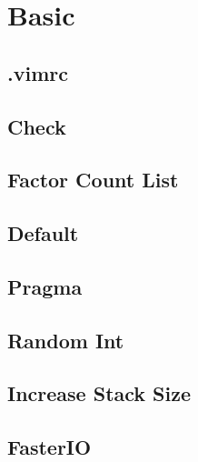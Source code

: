\documentclass[a4paper,10pt,twocolumn,oneside]{article}
\begin{document}
\pagestyle{fancy}
\fancyfoot{}
\fancyhead[R]{\thepage}
\renewcommand{\headrulewidth}{0.4pt}
\renewcommand{\contentsname}{Contents}


\scriptsize
\tableofcontents


\section{Basic}

\subsection{.vimrc}


\subsection{Check}


\subsection{Factor Count List}


\subsection{Default}


\subsection{Pragma}


\subsection{Random Int}


\subsection{Increase Stack Size}


\subsection{FasterIO}

\end{document}
